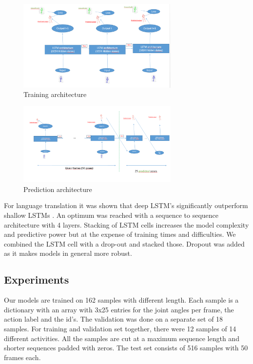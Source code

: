 \begin{figure}[h!]
	\includegraphics[width=8cm]{Training_architecture.PNG}
	\caption{Training architecture}
	\label{fig:training}
\end{figure}

\begin{figure}[h!]
	\includegraphics[width=8cm]{Prediciton_achitecture.PNG}
	\caption{Prediction architecture}
	\label{fig:prediction}
\end{figure}


For language translation it was shown that deep LSTM's significantly outperform shallow LSTMs \cite{Sutskever2014}. An optimum was reached with a sequence to sequence architecture with 4 layers. Stacking of LSTM cells increases the model complexity and predictive power but at the expense of training times and difficulties. We combined the LSTM cell with a drop-out and stacked those. Dropout was added as it makes models in general more robust.

\subsection{Experiments}

Our models are trained on 162 samples with different length. Each sample is a dictionary with an array with 3x25 entries for the joint angles per frame, the action label and the id's. The validation was done on a separate set of 18 samples. For training and validation set together, there were 12 samples of 14 different activities. All the samples are cut at a maximum sequence length and shorter sequences padded with zeros. The test set consists of 516 samples with 50 frames each.

